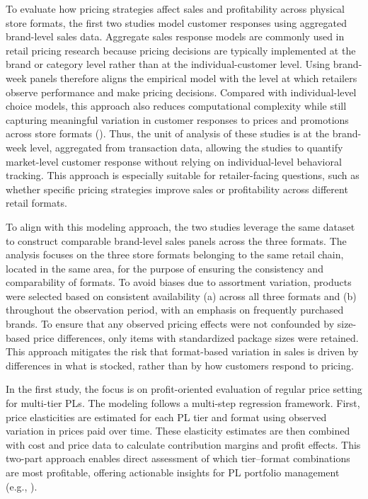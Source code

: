 To evaluate how pricing strategies affect sales and profitability across physical store formats, the first two studies model customer responses using aggregated brand-level sales data. Aggregate sales response models are commonly used in retail pricing research because pricing decisions are typically implemented at the brand or category level rather than at the individual-customer level. Using brand-week panels therefore aligns the empirical model with the level at which retailers observe performance and make pricing decisions. Compared with individual-level choice models, this approach also reduces computational complexity while still capturing meaningful variation in customer responses to prices and promotions across store formats (\cite{Pauwels2007-ky,Datta2022-fz}). Thus, the unit of analysis of these studies is at the brand-week level, aggregated from transaction data, allowing the studies to quantify market-level customer response without relying on individual-level behavioral tracking. This approach is especially suitable for retailer-facing questions, such as whether specific pricing strategies improve sales or profitability across different retail formats.

To align with this modeling approach, the two studies leverage the same dataset to construct comparable brand-level sales panels across the three formats. The analysis focuses on the three store formats belonging to the same retail chain, located in the same area, for the purpose of ensuring the consistency and comparability of formats. To avoid biases due to assortment variation, products were selected based on consistent availability (a) across all three formats and (b) throughout the observation period, with an emphasis on frequently purchased brands. To ensure that any observed pricing effects were not confounded by size-based price differences, only items with standardized package sizes were retained. This approach mitigates the risk that format-based variation in sales is driven by differences in what is stocked, rather than by how customers respond to pricing.

In the first study, the focus is on profit-oriented evaluation of regular price setting for multi-tier PLs. The modeling follows a multi-step regression framework. First, price elasticities are estimated for each PL tier and format using observed variation in prices paid over time. These elasticity estimates are then combined with cost and price data to calculate contribution margins and profit effects. This two-part approach enables direct assessment of which tier–format combinations are most profitable, offering actionable insights for PL portfolio management (e.g., \cite{Geyskens2010-bx,Keller2020-so,ter-Braak2013-uq}).

